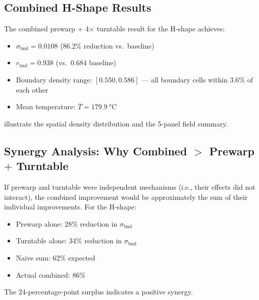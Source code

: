 \documentclass[10pt,twocolumn]{article}
\newcommand{\bndstd}{\sigma_{\mathrm{bnd}}}
\begin{document}
\subsection{Combined H-Shape Results}

The combined prewarp + 4$\times$ turntable result for the H-shape
achieves:
\begin{itemize}
  \item $\bndstd = 0.0108$ (86.2\% reduction vs.\ baseline)
  \item $r_{\mathrm{bnd}} = 0.938$ (vs.\ 0.684 baseline)
  \item Boundary density range: $[0.550, 0.586]$ --- all boundary cells
        within 3.6\% of each other
  \item Mean temperature: $\bar{T} = \SI{179.9}{\celsius}$
\end{itemize}
 illustrate the spatial
density distribution and the 5-panel field summary.

\subsection{Synergy Analysis: Why Combined $>$ Prewarp $+$ Turntable}

If prewarp and turntable were independent mechanisms (i.e., their
effects did not interact), the combined improvement would be
approximately the sum of their individual improvements.  For the
H-shape:
\begin{itemize}
  \item Prewarp alone: 28\% reduction in $\bndstd$
  \item Turntable alone: 34\% reduction in $\bndstd$
  \item Naive sum: 62\% expected
  \item Actual combined: 86\%
\end{itemize}
The 24-percentage-point surplus indicates a positive synergy.
\end{document}
